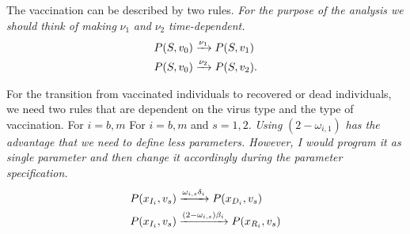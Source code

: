 The vaccination can be described by two rules. \textit{For the purpose of the analysis we should think of making} $\nu_1$ \textit{and} $\nu_2$ \textit{time-dependent.}
\begin{align}
    P(S, v_0) &\xrightarrow{\nu_1} P(S, v_1) \\
    P(S, v_0) &\xrightarrow{\nu_2} P(S, v_2).\notag
\end{align}

For the transition from vaccinated individuals to recovered or dead individuals, we need two rules that are dependent on the virus type and the type of vaccination. For $i = b,m$ For $i = b,m$ and $s = 1,2$. \textit{Using} $(2-\omega_{i,1})$ \textit{has the advantage that we need to define less parameters. However, I would program it as single parameter and then change it accordingly during the parameter specification.}
\begin{align}
    P(x_{I_i},  v_s) &\xrightarrow{\omega_{i,s} \delta_i} P(x_{D_i}, v_s) \\
    P(x_{I_i}, v_s) &\xrightarrow{(2-\omega_{i,s})\beta_i} P(x_{R_i}, v_s)\notag
\end{align}

